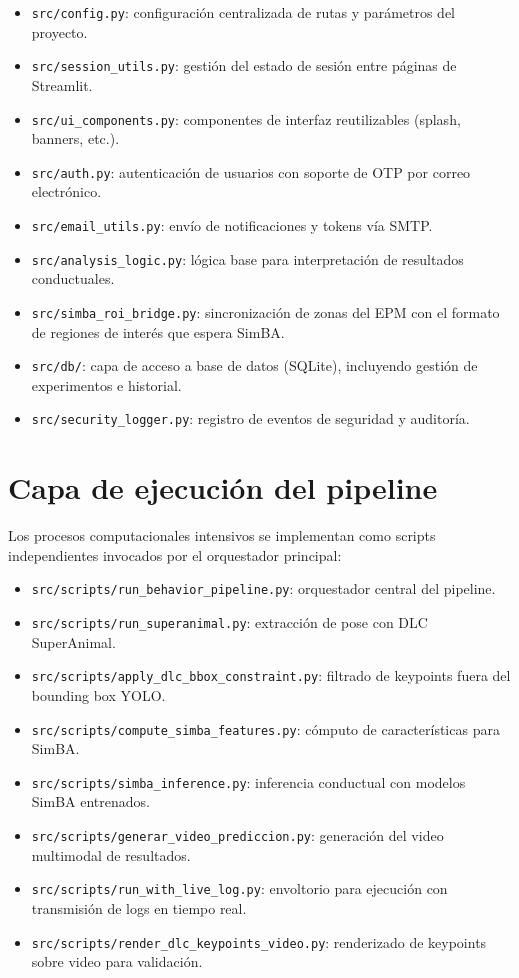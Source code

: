 \documentclass[12pt]{report}
\begin{document}
\begin{itemize}[leftmargin=*]
    \item \texttt{src/config.py}: configuración centralizada de rutas y parámetros del proyecto.
    \item \texttt{src/session\_utils.py}: gestión del estado de sesión entre páginas de Streamlit.
    \item \texttt{src/ui\_components.py}: componentes de interfaz reutilizables (splash, banners, etc.).
    \item \texttt{src/auth.py}: autenticación de usuarios con soporte de OTP por correo electrónico.
    \item \texttt{src/email\_utils.py}: envío de notificaciones y tokens vía SMTP.
    \item \texttt{src/analysis\_logic.py}: lógica base para interpretación de resultados conductuales.
    \item \texttt{src/simba\_roi\_bridge.py}: sincronización de zonas del EPM con el formato de regiones
          de interés que espera SimBA.
    \item \texttt{src/db/}: capa de acceso a base de datos (SQLite), incluyendo gestión de experimentos
          e historial.
    \item \texttt{src/security\_logger.py}: registro de eventos de seguridad y auditoría.
\end{itemize}

\section{Capa de ejecución del pipeline}

Los procesos computacionales intensivos se implementan como scripts independientes
invocados por el orquestador principal:

\begin{itemize}[leftmargin=*]
    \item \texttt{src/scripts/run\_behavior\_pipeline.py}: orquestador central del pipeline.
    \item \texttt{src/scripts/run\_superanimal.py}: extracción de pose con DLC SuperAnimal.
    \item \texttt{src/scripts/apply\_dlc\_bbox\_constraint.py}: filtrado de keypoints fuera del bounding box YOLO.
    \item \texttt{src/scripts/compute\_simba\_features.py}: cómputo de características para SimBA.
    \item \texttt{src/scripts/simba\_inference.py}: inferencia conductual con modelos SimBA entrenados.
    \item \texttt{src/scripts/generar\_video\_prediccion.py}: generación del video multimodal de resultados.
    \item \texttt{src/scripts/run\_with\_live\_log.py}: envoltorio para ejecución con transmisión de logs en tiempo real.
    \item \texttt{src/scripts/render\_dlc\_keypoints\_video.py}: renderizado de keypoints sobre video para validación.
\end{itemize}
\end{document}
